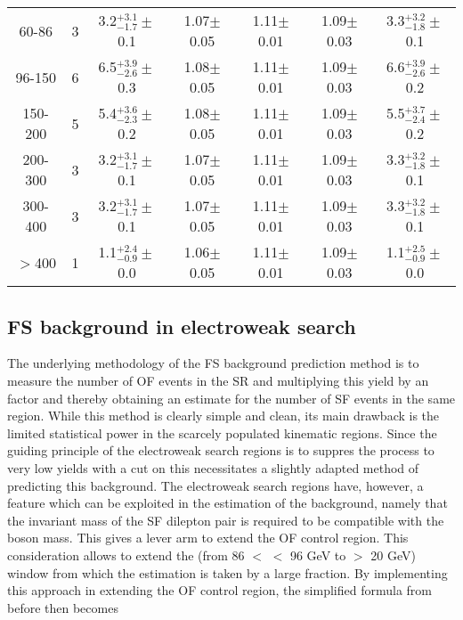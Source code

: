\begin{table}[ht!]
\begin{center}
\begin{tabular}{ c  c  c  c  c  c c}
 60-86    & 3    & 3.2$^{+3.1}_{-1.7}\pm$0.1  &  1.07$\pm$0.05 & 1.11$\pm$0.01& 1.09$\pm$0.03 & 3.3$^{+3.2}_{-1.8}\pm$0.1 \\
 96-150   & 6    & 6.5$^{+3.9}_{-2.6}\pm$0.3  &  1.08$\pm$0.05 & 1.11$\pm$0.01& 1.09$\pm$0.03 & 6.6$^{+3.9}_{-2.6}\pm$0.2 \\
 150-200  & 5    & 5.4$^{+3.6}_{-2.3}\pm$0.2  &  1.08$\pm$0.05 & 1.11$\pm$0.01& 1.09$\pm$0.03 & 5.5$^{+3.7}_{-2.4}\pm$0.2 \\
 200-300  & 3    & 3.2$^{+3.1}_{-1.7}\pm$0.1  &  1.07$\pm$0.05 & 1.11$\pm$0.01& 1.09$\pm$0.03 & 3.3$^{+3.2}_{-1.8}\pm$0.1 \\
 300-400  & 3    & 3.2$^{+3.1}_{-1.7}\pm$0.1  &  1.07$\pm$0.05 & 1.11$\pm$0.01& 1.09$\pm$0.03 & 3.3$^{+3.2}_{-1.8}\pm$0.1 \\
 $>$400   & 1    & 1.1$^{+2.4}_{-0.9}\pm$0.0  &  1.06$\pm$0.05 & 1.11$\pm$0.01& 1.09$\pm$0.03 & 1.1$^{+2.5}_{-0.9}\pm$0.0 \\
\hline\hline
\end{tabular}
\end{center}
\end{table}                                                                                                                                                          

\subsection{FS background in electroweak search}
\label{subsec:fsewino}

The underlying methodology of the FS background prediction method is to measure the number of OF events in the SR and multiplying this yield by an factor \Rsfof and thereby obtaining an estimate for the number of SF events in the same region. 
While this method is clearly simple and clean, its main drawback is the limited statistical power in the scarcely populated kinematic regions. 
Since the guiding principle of the electroweak search regions is to suppres the \ttbar process to very low yields with a cut on \mttwo this necessitates a slightly adapted method of predicting this background. 
The electroweak search regions have, however, a feature which can be exploited in the estimation of the \ttbar background, namely that the invariant mass of the SF dilepton pair is required to be compatible with the \PZ boson mass. 
This gives a lever arm to extend the OF control region. 
This consideration allows to extend the \mll (from 86 $<$ \mll $<$ 96 GeV to \mll $>$ 20 GeV) window from which the estimation is taken by a large fraction. 
By implementing this approach in extending the OF control region, the simplified formula from before then becomes

